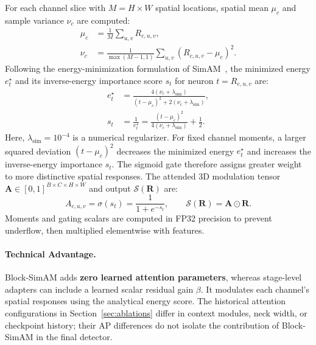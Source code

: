 For each channel slice with $M = H \times W$ spatial locations, spatial mean $\mu_c$ and sample variance $\nu_c$ are computed:
\begin{equation}
    \begin{aligned}
        \mu_c &= \frac{1}{M}\sum_{u, v} R_{c, u, v}, \\
        \nu_c &= \frac{1}{\max(M-1, 1)}\sum_{u, v} (R_{c, u, v} - \mu_c)^2.
    \end{aligned}
    \label{eq:spatial_moments}
\end{equation}
Following the energy-minimization formulation of SimAM~\cite{yang2021simam}, the minimized energy $e_t^\star$ and its inverse-energy importance score $s_t$ for neuron $t = R_{c,u,v}$ are:
\begin{equation}
    \begin{aligned}
        e_t^\star &= \frac{4(\nu_c + \lambda_{\mathrm{sim}})}{(t-\mu_c)^2 + 2(\nu_c + \lambda_{\mathrm{sim}})}, \\
        s_t &= \frac{1}{e_t^\star} = \frac{(t - \mu_c)^2}{4(\nu_c + \lambda_{\mathrm{sim}})} + \frac{1}{2}.
    \end{aligned}
    \label{eq:simam_energy}
\end{equation}
Here, $\lambda_{\mathrm{sim}} = 10^{-4}$ is a numerical regularizer. For fixed channel moments, a larger squared deviation $(t-\mu_c)^2$ decreases the minimized energy $e_t^\star$ and increases the inverse-energy importance $s_t$. The sigmoid gate therefore assigns greater weight to more distinctive spatial responses. The attended 3D modulation tensor $\mathbf{A} \in [0, 1]^{B \times C \times H \times W}$ and output $\mathcal{S}(\mathbf{R})$ are:
\begin{equation}
    A_{c, u, v} = \sigma(s_t) = \frac{1}{1 + e^{-s_t}}, \qquad \mathcal{S}(\mathbf{R}) = \mathbf{A} \odot \mathbf{R}.
    \label{eq:simam_modulation}
\end{equation}
Moments and gating scalars are computed in FP32 precision to prevent underflow, then multiplied elementwise with features.

\paragraph{Technical Advantage.}
Block-SimAM adds \textbf{zero learned attention parameters}, whereas stage-level adapters can include a learned scalar residual gain $\beta$. It modulates each channel's spatial responses using the analytical energy score. The historical attention configurations in Section~\ref{sec:ablations} differ in context modules, neck width, or checkpoint history; their AP differences do not isolate the contribution of Block-SimAM in the final detector.


